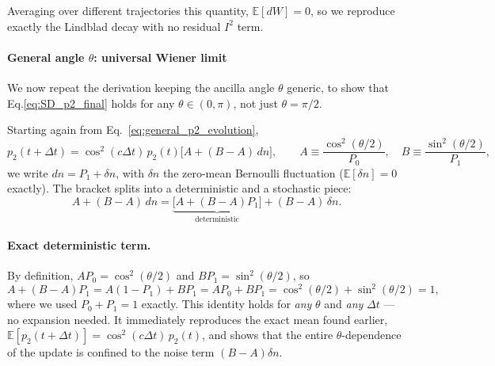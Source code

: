 \documentclass[a4paper,12pt]{article}
\begin{document}
Averaging over different trajectories this quantity, $ \mathbb{E} \left[dW\right] = 0 $, so we reproduce exactly the Lindblad decay with no residual $I^2$ term.

\paragraph{General angle $\theta$: universal Wiener limit}
We now repeat the derivation keeping the ancilla angle $\theta$ generic, to show that Eq.\ref{eq:SD_p2_final} holds for any $\theta\in(0,\pi)$, not just $\theta=\pi/2$.

Starting again from Eq.~\ref{eq:general_p2_evolution},
\begin{equation}
	p_{2}(t+\Delta t) = \cos^{2}(c\Delta t)\, p_{2}(t) \Big[ A + (B-A)\, dn \Big], \qquad A \equiv \frac{\cos^{2}(\theta/2)}{P_{0}},\quad B \equiv \frac{\sin^{2}(\theta/2)}{P_{1}},
	\label{eq:general_bracket}
\end{equation}
we write $dn = P_{1} + \delta n$, with $\delta n$ the zero-mean Bernoulli fluctuation ($\mathbb{E}[\delta n]=0$ exactly). The bracket splits into a deterministic and a stochastic piece:
\begin{equation}
	A + (B-A)\,dn = \underbrace{\big[A + (B-A)P_{1}\big]}_{\text{deterministic}} + (B-A)\,\delta n .
	\label{eq:general_split}
\end{equation}

\paragraph{Exact deterministic term.}
By definition, $A P_{0} = \cos^{2}(\theta/2)$ and $B P_{1} = \sin^{2}(\theta/2)$, so
\begin{equation}
	A + (B-A)P_{1} = A(1-P_{1}) + B P_{1} = A P_{0} + B P_{1} = \cos^{2}(\theta/2) + \sin^{2}(\theta/2) = 1 ,
	\label{eq:exact_deterministic}
\end{equation}
where we used $P_{0}+P_{1}=1$ exactly. This identity holds for \emph{any} $\theta$ and \emph{any} $\Delta t$ — no expansion needed. It immediately reproduces the exact mean found earlier, $\mathbb{E}[p_{2}(t+\Delta t)] = \cos^{2}(c\Delta t)\,p_{2}(t)$, and shows that the entire $\theta$-dependence of the update is confined to the noise term $(B-A)\delta n$.
\end{document}
